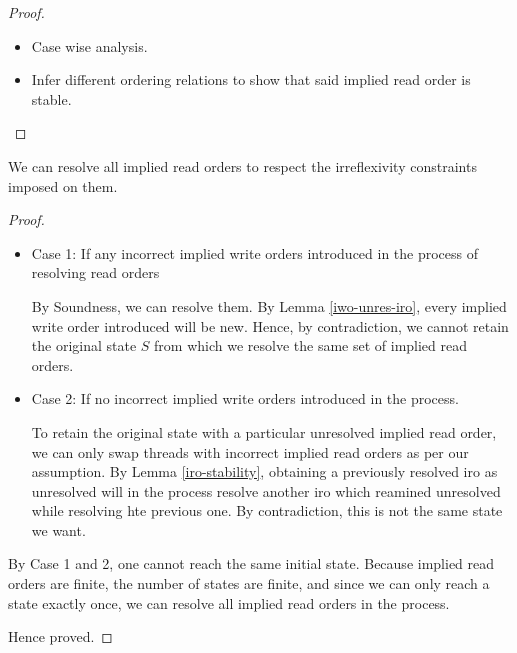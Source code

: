     \begin{proof}

        \begin{itemize}
            \item Case wise analysis.
            \item Infer different ordering relations to show that said implied read order is stable.
        \end{itemize}
        
    \end{proof}


    \begin{theorem}
        \label{fwdprog-iro}
        We can resolve all implied read orders to respect the irreflexivity constraints imposed on them.
    \end{theorem}

    \begin{proof}
        
        \begin{itemize}
            \item Case 1: If any incorrect implied write orders introduced in the process of resolving read orders 

                By Soundness, we can resolve them. 
                By Lemma \ref{iwo-unres-iro}, every implied write order introduced will be new.
                Hence, by contradiction, we cannot retain the original state $S$ from which we resolve the same set of implied read orders. 

            \item Case 2: If no incorrect implied write orders introduced in the process.

                To retain the original state with a particular unresolved implied read order, we can only swap threads with incorrect implied read orders as per our assumption. 
                By Lemma \ref{iro-stability}, obtaining a previously resolved iro as unresolved will in the process resolve another iro which reamined unresolved while resolving hte previous one.
                By contradiction, this is not the same state we want. \
        \end{itemize}

        By Case 1 and 2, one cannot reach the same initial state.
        Because implied read orders are finite, the number of states are finite, and since we can only reach a state exactly once, 
        we can resolve all implied read orders in the process. 

        Hence proved.

    \end{proof}

